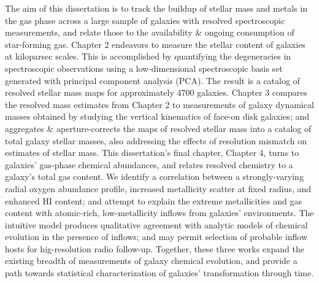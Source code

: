 The aim of this dissertation is to track the buildup of stellar mass and metals in the gas phase across a large sample of galaxies with resolved spectroscopic measurements, and relate those to the availability \& ongoing consumption of star-forming gas. Chapter 2 endeavors to measure the stellar content of galaxies at kiloparsec scales. 
This is accomplished by quantifying the degeneracies in spectroscopic observations using a low-dimensional spectroscopic basis set generated with principal component analysis (PCA). The result is a catalog of resolved stellar mass maps for approximately 4700 galaxies. Chapter 3 compares the resolved mass estimates from Chapter 2 to measurements of galaxy dynamical masses obtained by studying the vertical kinematics of face-on disk galaxies; and aggregates \& aperture-corrects the maps of resolved stellar mass into a catalog of total galaxy stellar masses, also addressing the effects of resolution mismatch on estimates of stellar mass. This dissertation's final chapter, Chapter 4, turns to galaxies' gas-phase chemical abundances, and relates resolved chemistry to a galaxy's total gas content. We identify a correlation between a strongly-varying radial oxygen abundance profile, increased metallicity scatter at fixed radius, and enhanced HI content; and attempt to explain the extreme metallicities and gas content with atomic-rich, low-metallicity inflows from galaxies' environments. The intuitive model produces qualitative agreement with analytic models of chemical evolution in the presence of inflows; and may permit selection of probable inflow hosts for hig-resolution radio follow-up. Together, these three works expand the existing breadth of measurements of galaxy chemical evolution, and provide a path towards statistical characterization of galaxies' transformation through time.


{}



